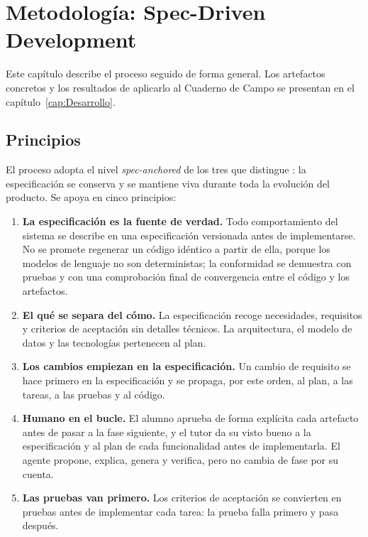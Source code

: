 \chapter{Metodología: Spec-Driven Development}\label{cap:Metodologia}

Este capítulo describe el proceso seguido de forma general. Los artefactos concretos y los resultados de aplicarlo al Cuaderno de Campo se presentan en el capítulo~\ref{cap:Desarrollo}.

\section{Principios}\label{sec:Principios}

El proceso adopta el nivel \emph{spec-anchored} de los tres que distingue \citet{bockeler2025sdd}: la especificación se conserva y se mantiene viva durante toda la evolución del producto. Se apoya en cinco principios:

\begin{enumerate}
	\item \textbf{La especificación es la fuente de verdad.} Todo comportamiento del sistema se describe en una especificación versionada antes de implementarse. No se promete regenerar un código idéntico a partir de ella, porque los modelos de lenguaje no son deterministas; la conformidad se demuestra con pruebas y con una comprobación final de convergencia entre el código y los artefactos.
	\item \textbf{El qué se separa del cómo.} La especificación recoge necesidades, requisitos y criterios de aceptación sin detalles técnicos. La arquitectura, el modelo de datos y las tecnologías pertenecen al plan.
	\item \textbf{Los cambios empiezan en la especificación.} Un cambio de requisito se hace primero en la especificación y se propaga, por este orden, al plan, a las tareas, a las pruebas y al código.
	\item \textbf{Humano en el bucle.} El alumno aprueba de forma explícita cada artefacto antes de pasar a la fase siguiente, y el tutor da su visto bueno a la especificación y al plan de cada funcionalidad antes de implementarla. El agente propone, explica, genera y verifica, pero no cambia de fase por su cuenta.
	\item \textbf{Las pruebas van primero.} Los criterios de aceptación se convierten en pruebas antes de implementar cada tarea: la prueba falla primero y pasa después.
\end{enumerate}


